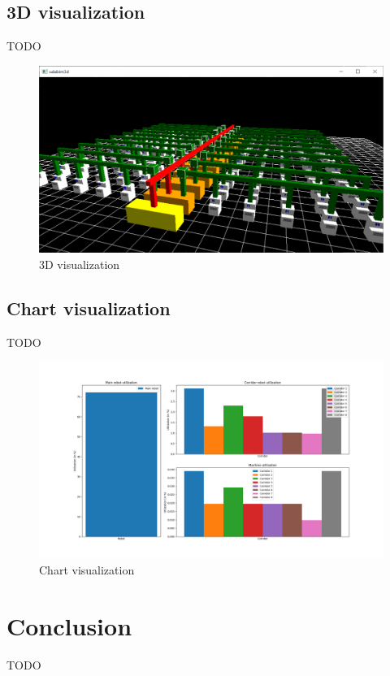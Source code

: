 \documentclass{article}
\begin{document}
    \subsection{3D visualization}
    TODO

    \begin{figure}
        \includegraphics[width=\textwidth]{../../screenshots/salabim.png}
        \caption{3D visualization}
    \end{figure}

    \subsection{Chart visualization}
    TODO

    \begin{figure}
        \includegraphics[width=\textwidth]{../../screenshots/pyplot.png}
        \caption{Chart visualization}
    \end{figure}

    \section{Conclusion}
    \label{sec:con}
    TODO~\cite{key}

    
    
\end{document}
